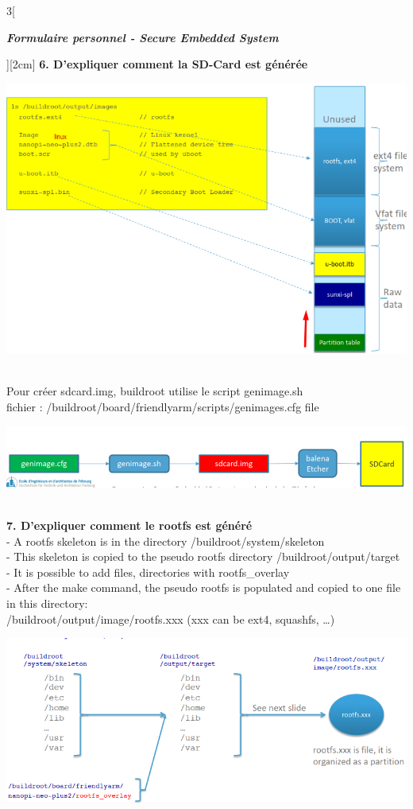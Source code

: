 \begin{multicols}{3}[\centerline{ \large\em \textbf{Formulaire personnel - Secure Embedded System}}][2cm]
\textbf{6. D’expliquer comment la SD-Card est générée\\}
\begin{minipage}{\linewidth}
	\centering
    \includegraphics[width =0.8\columnwidth]{images/5.png}
\end{minipage}\\
Pour créer sdcard.img, buildroot utilise le script genimage.sh \\
fichier : /buildroot/board/friendlyarm/scripts/genimages.cfg file\\
\begin{minipage}{\linewidth}
	\centering
    \includegraphics[width =0.8\columnwidth]{images/11.png}
\end{minipage}
\\ \textbf{7. D’expliquer comment le rootfs est généré\\}
- A rootfs skeleton is in the directory /buildroot/system/skeleton\\
- This skeleton is copied to the pseudo rootfs directory /buildroot/output/target\\
- It is possible to add files, directories with rootfs\_overlay\\
- After the make command, the pseudo rootfs is populated and copied to one file in this directory: \\
/buildroot/output/image/rootfs.xxx (xxx can be ext4,
squashfs, …)\\
\begin{minipage}{\linewidth}
	\centering
    \includegraphics[width =0.8\columnwidth]{images/6.png}

\end{minipage}
\end{multicols}
